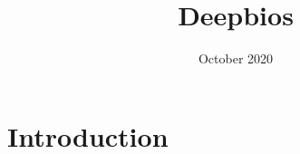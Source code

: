 \documentclass{article}
\title{Deepbios}
\author{ }
\date{October 2020}
\begin{document}
\maketitle

\section{Introduction}
\end{document}
